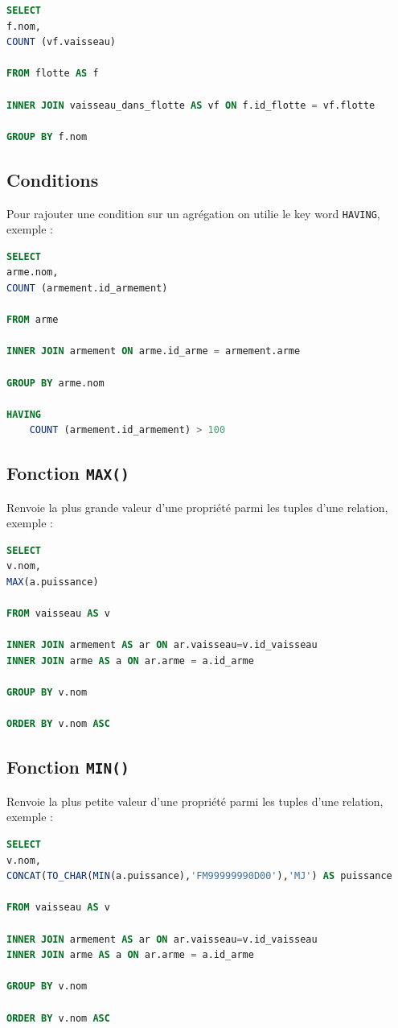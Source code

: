 \begin{lstlisting}[language=SQL]
SELECT
f.nom,
COUNT (vf.vaisseau)

FROM flotte AS f

INNER JOIN vaisseau_dans_flotte AS vf ON f.id_flotte = vf.flotte

GROUP BY f.nom
\end{lstlisting}

\subsection{Conditions}
Pour rajouter une condition sur un agrégation on utilie le key word \texttt{HAVING}, exemple :

\begin{lstlisting}[language=SQL]
SELECT
arme.nom,
COUNT (armement.id_armement)

FROM arme

INNER JOIN armement ON arme.id_arme = armement.arme

GROUP BY arme.nom

HAVING
    COUNT (armement.id_armement) > 100
\end{lstlisting}

\subsection{Fonction \texttt{MAX()}}
Renvoie la plus grande valeur d'une propriété parmi les tuples d'une relation, exemple : 

\begin{lstlisting}[language = SQL]
SELECT
v.nom,
MAX(a.puissance)

FROM vaisseau AS v

INNER JOIN armement AS ar ON ar.vaisseau=v.id_vaisseau
INNER JOIN arme AS a ON ar.arme = a.id_arme

GROUP BY v.nom

ORDER BY v.nom ASC
\end{lstlisting}

\subsection{Fonction \texttt{MIN()}}
Renvoie la plus petite valeur d'une propriété parmi les tuples d'une relation, exemple : 

\begin{lstlisting}[language = SQL]
SELECT
v.nom,
CONCAT(TO_CHAR(MIN(a.puissance),'FM99999990D00'),'MJ') AS puissance

FROM vaisseau AS v

INNER JOIN armement AS ar ON ar.vaisseau=v.id_vaisseau
INNER JOIN arme AS a ON ar.arme = a.id_arme

GROUP BY v.nom

ORDER BY v.nom ASC
\end{lstlisting}

